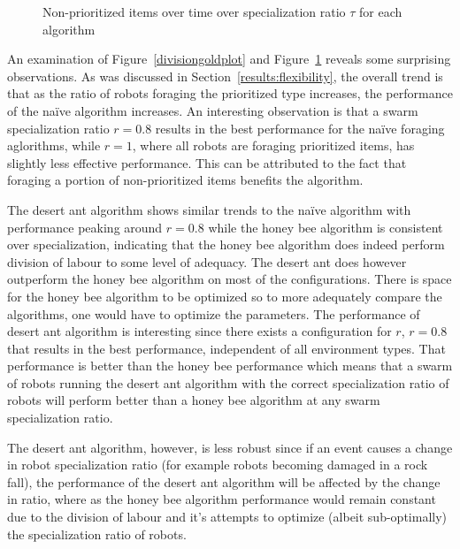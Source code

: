 \begin{figure}[!htb]
\centering
\resizebox{\textwidth}{!}{}
\caption{Non-prioritized items over time over specialization ratio $\tau$ for each algorithm}
\label{divisionwasteplot}
\end{figure}

An examination of Figure~\ref{divisiongoldplot} and Figure~\ref{divisionwasteplot} reveals some surprising observations.
As was discussed in Section~\ref{results:flexibility}, the overall trend is that as the ratio of robots foraging the prioritized type increases, the performance of the na\"ive algorithm increases. An interesting observation is that a swarm specialization ratio $r=0.8$ results in the best performance for the na\"ive foraging aglorithms, while $r=1$, where all robots are foraging prioritized items, has slightly less effective performance. This can be attributed to the fact that foraging a portion of non-prioritized items benefits the algorithm.

The desert ant algorithm shows similar trends to the na\"ive algorithm with performance peaking around $r=0.8$ while the honey bee algorithm is consistent over specialization, indicating that the honey bee algorithm does indeed perform division of labour to some level of adequacy. The desert ant does however outperform the honey bee algorithm on most of the configurations. There is space for the honey bee algorithm to be optimized so to more adequately compare the algorithms, one would have to optimize the parameters. 
The performance of desert ant algorithm is interesting since there exists a configuration for $r$, $r=0.8$ that results in the best performance, independent of all environment types. That performance is better than the honey bee performance which means that a swarm of robots running the desert ant algorithm with the correct specialization ratio of robots will perform better than a honey bee algorithm at any swarm specialization ratio. 

The desert ant algorithm, however, is less robust since if an event causes a change in robot specialization ratio (for example robots becoming damaged in a rock fall), the performance of the desert ant algorithm will be affected by the change in ratio, where as the honey bee algorithm performance would remain constant due to the division of labour and it's attempts to optimize (albeit sub-optimally) the specialization ratio of robots. 

